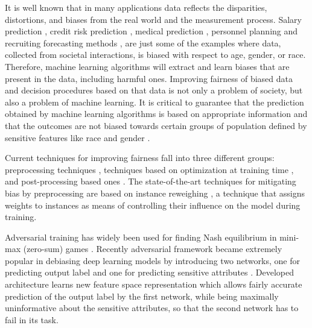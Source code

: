 \documentclass[preprint,12pt]{elsarticle}
\begin{document}
It is well known that in many applications data reflects the disparities, distortions, and biases from the real world and the measurement process. Salary prediction \cite{innocenti2016mining}, credit risk prediction \cite{li2019credit}, medical prediction \cite{boyd1996relationship}, personnel planning and recruiting forecasting methods \cite{kim2016data}, are just some of the examples where data, collected from societal interactions, is biased with respect to age, gender, or race. Therefore, machine learning algorithms will extract and learn biases that are present in the data, including harmful ones.
Improving fairness of biased data and decision procedures based on that data is not only a problem of society, but also a problem of machine learning.  It is critical to guarantee that the prediction obtained by machine learning algorithms is based on appropriate information and that the outcomes are not biased towards certain groups of population defined by sensitive features like race and gender \cite{wang2019approaching}.

Current techniques for improving fairness fall into three different groups: preprocessing techniques \cite{kamiran2012decision,calmon2017optimized}, techniques based on optimization at training time \cite{zafar2019fairness,adel2019one,celis2019classification,kamishima2012fairness}, and post-processing based ones \cite{hardt2016equality, pleiss2017fairness}. The state-of-the-art techniques for mitigating bias by preprocessing are based on instance reweighing \cite{kamiran2012data}, a technique that assigns weights to instances as means of controlling their influence on the model during training.

Adversarial training has widely been used for finding Nash equilibrium in mini-max (zero-sum) games \cite{goodfellow2014generative}. Recently adversarial framework became extremely popular in debiasing deep learning models by introducing two networks, one for predicting output label and one for predicting sensitive attributes \cite{wadsworth2018achieving}. Developed architecture learns new feature space representation which allows fairly accurate prediction of the output label by the first network, while being maximally uninformative about the sensitive attributes, so that the second network has to fail in its task.
\end{document}
